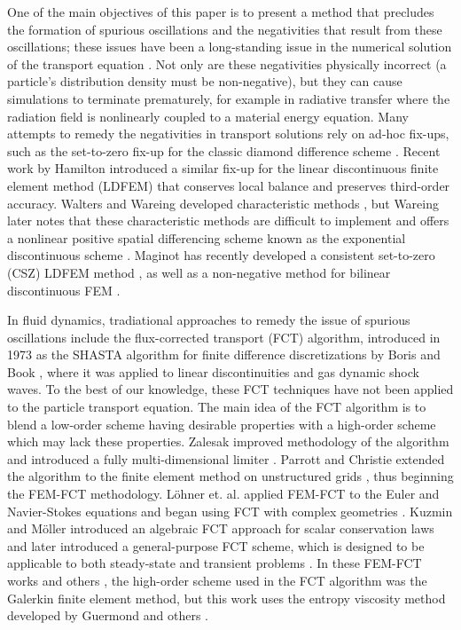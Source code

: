 One of the main objectives of this paper is to present a method that precludes
the formation of spurious oscillations and the negativities that result from
these oscillations; these issues have been a long-standing issue in the
numerical solution of the transport equation \cite{lathrop}.
Not only are these negativities physically incorrect
(a particle's distribution density must be non-negative), but they can cause
simulations to terminate prematurely, for example in radiative transfer where
the radiation field is nonlinearly coupled to a material energy equation.
Many attempts to remedy the negativities in
transport solutions rely on ad-hoc fix-ups, such as the set-to-zero fix-up for the
classic diamond difference scheme \cite{lewis}. Recent work by Hamilton
introduced a similar fix-up for the linear discontinuous finite element
method (LDFEM) that conserves local balance and preserves third-order accuracy.
Walters and Wareing developed characteristic methods \cite{walters_NC}, but
Wareing later notes that these characteristic methods are difficult to
implement and offers a nonlinear positive spatial differencing scheme
known as the exponential discontinuous scheme \cite{wareing}.
Maginot has recently developed a consistent set-to-zero (CSZ) LDFEM
method \cite{maginot}, as well as a non-negative method for bilinear
discontinuous FEM \cite{maginot_mc2015}\cite{maginot_2017}.

In fluid dynamics, tradiational approaches to remedy the issue of spurious oscillations include
the flux-corrected transport (FCT) algorithm, introduced in 1973 as
the SHASTA algorithm for finite difference discretizations
by Boris and Book \cite{borisbook}, where it was applied to linear discontinuities
and gas dynamic shock waves. To the best of our knowledge, these FCT techniques have not been
applied to the particle transport equation.
The main idea of the FCT algorithm is to blend a
low-order scheme having desirable properties with a high-order scheme which may
lack these properties.
Zalesak improved methodology of the algorithm and introduced a fully
multi-dimensional limiter \cite{zalesak}.
Parrott and Christie extended the algorithm to the finite element method
on unstructured grids \cite{parrott}, thus beginning the FEM-FCT methodology.
L\"{o}hner et. al. applied FEM-FCT to the Euler and Navier-Stokes equations and
began using FCT with complex geometries \cite{lohner}.
Kuzmin and M\"{o}ller introduced an algebraic FCT approach for scalar conservation
laws \cite{kuzmin_FCT} and later introduced a general-purpose FCT scheme, which
is designed to be applicable to both steady-state and transient problems \cite{kuzmin_general}.
In these FEM-FCT works and others \cite{moller_2008,kuzmin_failsafe,kuzmin_closepacking},
the high-order scheme used in the FCT algorithm was the Galerkin finite element
method, but this work uses the entropy viscosity method developed by Guermond
and others \cite{guermond_ev}.

